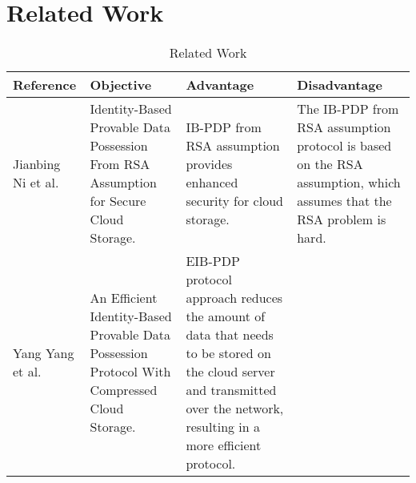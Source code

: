\section{Related Work}


\scriptsize
\begin{table}[h!]
\caption{Related Work}
\label{table:1}
\begin{tabular}{| m{3.1cm} | m{5cm}| m{3.9cm} | m{3.9cm} |} 
  \hline
  Reference & Objective & Advantage & Disadvantage\\
  \hline
  Jianbing Ni et al. \cite{1} & 
  Identity-Based Provable Data Possession From RSA Assumption for Secure Cloud Storage.
  
& 
 IB-PDP from RSA assumption provides enhanced security for cloud storage.

 & 
The IB-PDP from RSA assumption protocol is based on the RSA assumption, which assumes that the RSA problem is hard. \\ 
  \hline
  Yang Yang et al. \cite{2} & 
  An Efficient Identity-Based Provable Data Possession Protocol With Compressed Cloud Storage. 

& 
 EIB-PDP protocol approach reduces the amount of data that needs to be stored on the cloud server and transmitted over the network, resulting in a more efficient protocol.
 & 


\end{tabular}
\end{table}
